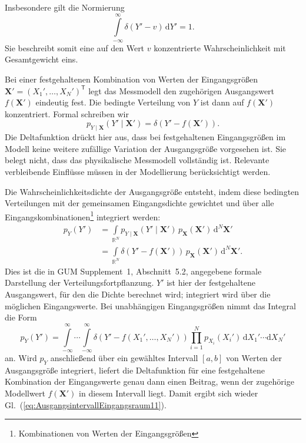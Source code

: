 Insbesondere gilt die Normierung
\begin{equation}
\int\limits_{-\infty}^{\infty}
\delta(Y'-v)\,\mathrm dY'=1.
\end{equation}
Sie beschreibt somit eine auf den Wert $v$ konzentrierte
Wahrscheinlichkeit mit Gesamtgewicht eins.

Bei einer festgehaltenen Kombination von Werten der Eingangsgrößen
$\mathbf X'=(X_1',\dots,X_N')^\mathsf T$ legt das Messmodell
den zugehörigen Ausgangswert $f(\mathbf X')$ eindeutig fest.
Die bedingte Verteilung von $Y$ ist dann auf $f(\mathbf X')$
konzentriert. Formal schreiben wir
\begin{equation}
p_{Y\mid\mathbf X}(Y'\mid\mathbf X')
=\delta\!\left(Y'-f(\mathbf X')\right).
\end{equation}
Die Deltafunktion drückt hier aus, dass bei festgehaltenen
Eingangsgrößen im Modell keine weitere zufällige Variation
der Ausgangsgröße vorgesehen ist.
Sie belegt nicht, dass das physikalische Messmodell vollständig ist.
Relevante verbleibende Einflüsse müssen in der Modellierung
berücksichtigt werden.

Die Wahrscheinlichkeitsdichte der Ausgangsgröße entsteht, indem diese bedingten Verteilungen
mit der gemeinsamen Eingangsdichte gewichtet und über alle
Eingangskombinationen\footnote{Kombinationen von Werten der Eingangsgrößen} integriert werden:
\begin{equation}
\begin{aligned}
p_Y(Y')
&=\int\limits_{\mathbb R^N}
p_{Y\mid\mathbf X}(Y'\mid\mathbf X')\,
p_{\mathbf X}(\mathbf X')\,\mathrm d^N\mathbf X'
\\
&=\int\limits_{\mathbb R^N}
\delta\!\left(Y'-f(\mathbf X')\right)\,
p_{\mathbf X}(\mathbf X')\,\mathrm d^N\mathbf X'.
\end{aligned}
\label{eq:probCombinationGeneral}
\end{equation}
Dies ist die in GUM Supplement~1, Abschnitt~5.2, angegebene
formale Darstellung der Verteilungsfortpflanzung.
$Y'$ ist hier der festgehaltene Ausgangswert, für den die Dichte
berechnet wird; integriert wird über die möglichen Eingangswerte.
Bei unabhängigen Eingangsgrößen nimmt das Integral die Form
\begin{equation}
p_Y(Y')
=\int\limits_{-\infty}^{\infty}\!\cdots\!
\int\limits_{-\infty}^{\infty}
\delta\!\left(Y'-f(X_1',\dots,X_N')\right)
\prod_{i=1}^N p_{X_i}(X_i')\,
\mathrm d X_1'\cdots\mathrm d X_N'
\label{eq:wahrscheinlichkeitsdichteY}
\end{equation}
an. Wird $p_Y$ anschließend über ein gewähltes Intervall $[a,b]$
von Werten der Ausgangsgröße integriert, liefert die
Deltafunktion für eine festgehaltene Kombination der Eingangswerte
genau dann einen Beitrag, wenn der zugehörige Modellwert
$f(\mathbf X')$ in diesem Intervall liegt.
Damit ergibt sich wieder Gl.~(\ref{eq:AusgangsintervallEingangsraum11}).

